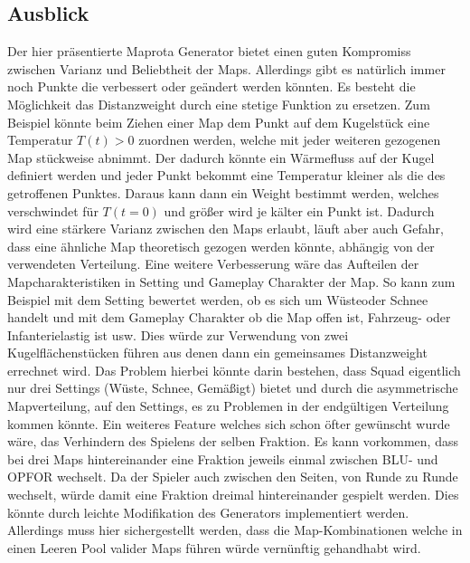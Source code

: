     \subsection{Ausblick}
        Der hier präsentierte Maprota Generator bietet einen guten Kompromiss zwischen Varianz und Beliebtheit der Maps. 
        Allerdings gibt es natürlich immer noch Punkte die verbessert oder geändert werden könnten.
        Es besteht die Möglichkeit das Distanzweight durch eine stetige Funktion zu ersetzen. 
        Zum Beispiel könnte beim Ziehen einer Map dem Punkt auf dem Kugelstück eine Temperatur $T(t)>0$ zuordnen werden,
        welche mit jeder weiteren gezogenen Map stückweise abnimmt.
        Der dadurch könnte ein Wärmefluss auf der Kugel definiert werden und jeder Punkt bekommt eine Temperatur kleiner als die des getroffenen Punktes. 
        Daraus kann dann ein Weight bestimmt werden, 
        welches verschwindet für $T(t=0)$ und größer wird je \glqq{}kälter\grqq{} ein Punkt ist. 
        Dadurch wird eine stärkere Varianz zwischen den Maps erlaubt, 
        läuft aber auch Gefahr, dass eine ähnliche Map theoretisch gezogen werden könnte, abhängig von der verwendeten Verteilung.
        Eine weitere Verbesserung wäre das Aufteilen der Mapcharakteristiken in \glqq{}Setting\grqq{} und \glqq{}Gameplay\grqq{} Charakter der Map. 
        So kann zum Beispiel mit dem Setting bewertet werden, ob es sich um \glqq{}Wüste\grqq{}oder \glqq{}Schnee\grqq{} handelt 
        und mit dem Gameplay Charakter ob die Map offen ist, Fahrzeug- oder Infanterielastig ist usw. 
        Dies würde zur Verwendung von zwei Kugelflächenstücken führen aus denen dann ein gemeinsames Distanzweight errechnet wird. 
        Das Problem hierbei könnte darin bestehen, dass Squad eigentlich nur drei Settings (\glqq{}Wüste\grqq{}, \glqq{}Schnee\grqq{}, \glqq{}Gemäßigt\grqq{}) 
        bietet und durch die asymmetrische Mapverteilung, auf den Settings, es zu Problemen in der endgültigen Verteilung kommen könnte.
        Ein weiteres Feature welches sich schon öfter gewünscht wurde wäre, das Verhindern des \glqq{}Spielens der selben Fraktion\grqq{}.
        Es kann vorkommen, dass bei drei Maps hintereinander eine Fraktion jeweils einmal zwischen BLU- und OPFOR wechselt. 
        Da der Spieler auch zwischen den Seiten, von Runde zu Runde wechselt, würde damit eine Fraktion dreimal hintereinander gespielt werden.
        Dies könnte durch leichte Modifikation des Generators implementiert werden. 
        Allerdings muss hier sichergestellt werden, dass die Map-Kombinationen welche in einen \glqq{}Leeren Pool valider Maps\grqq{} führen würde vernünftig gehandhabt wird.
